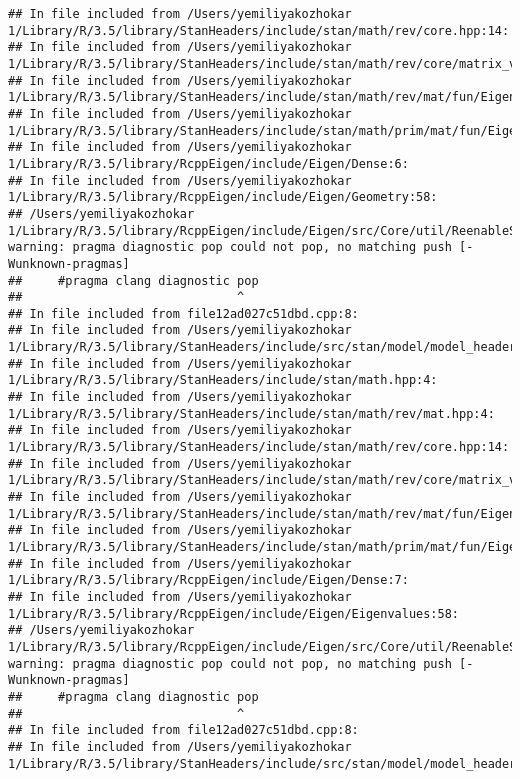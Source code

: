 \documentclass[]{article}
\begin{document}
\begin{verbatim}
## In file included from /Users/yemiliyakozhokar 1/Library/R/3.5/library/StanHeaders/include/stan/math/rev/core.hpp:14:
## In file included from /Users/yemiliyakozhokar 1/Library/R/3.5/library/StanHeaders/include/stan/math/rev/core/matrix_vari.hpp:4:
## In file included from /Users/yemiliyakozhokar 1/Library/R/3.5/library/StanHeaders/include/stan/math/rev/mat/fun/Eigen_NumTraits.hpp:4:
## In file included from /Users/yemiliyakozhokar 1/Library/R/3.5/library/StanHeaders/include/stan/math/prim/mat/fun/Eigen.hpp:4:
## In file included from /Users/yemiliyakozhokar 1/Library/R/3.5/library/RcppEigen/include/Eigen/Dense:6:
## In file included from /Users/yemiliyakozhokar 1/Library/R/3.5/library/RcppEigen/include/Eigen/Geometry:58:
## /Users/yemiliyakozhokar 1/Library/R/3.5/library/RcppEigen/include/Eigen/src/Core/util/ReenableStupidWarnings.h:10:30: warning: pragma diagnostic pop could not pop, no matching push [-Wunknown-pragmas]
##     #pragma clang diagnostic pop
##                              ^
## In file included from file12ad027c51dbd.cpp:8:
## In file included from /Users/yemiliyakozhokar 1/Library/R/3.5/library/StanHeaders/include/src/stan/model/model_header.hpp:4:
## In file included from /Users/yemiliyakozhokar 1/Library/R/3.5/library/StanHeaders/include/stan/math.hpp:4:
## In file included from /Users/yemiliyakozhokar 1/Library/R/3.5/library/StanHeaders/include/stan/math/rev/mat.hpp:4:
## In file included from /Users/yemiliyakozhokar 1/Library/R/3.5/library/StanHeaders/include/stan/math/rev/core.hpp:14:
## In file included from /Users/yemiliyakozhokar 1/Library/R/3.5/library/StanHeaders/include/stan/math/rev/core/matrix_vari.hpp:4:
## In file included from /Users/yemiliyakozhokar 1/Library/R/3.5/library/StanHeaders/include/stan/math/rev/mat/fun/Eigen_NumTraits.hpp:4:
## In file included from /Users/yemiliyakozhokar 1/Library/R/3.5/library/StanHeaders/include/stan/math/prim/mat/fun/Eigen.hpp:4:
## In file included from /Users/yemiliyakozhokar 1/Library/R/3.5/library/RcppEigen/include/Eigen/Dense:7:
## In file included from /Users/yemiliyakozhokar 1/Library/R/3.5/library/RcppEigen/include/Eigen/Eigenvalues:58:
## /Users/yemiliyakozhokar 1/Library/R/3.5/library/RcppEigen/include/Eigen/src/Core/util/ReenableStupidWarnings.h:10:30: warning: pragma diagnostic pop could not pop, no matching push [-Wunknown-pragmas]
##     #pragma clang diagnostic pop
##                              ^
## In file included from file12ad027c51dbd.cpp:8:
## In file included from /Users/yemiliyakozhokar 1/Library/R/3.5/library/StanHeaders/include/src/stan/model/model_header.hpp:4:

\end{verbatim}
\end{document}
